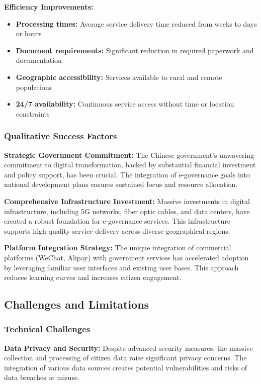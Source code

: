 \documentclass[12pt,a4paper]{article}
\begin{document}
\textbf{Efficiency Improvements:}
\begin{itemize}
    \item \textbf{Processing times:} Average service delivery time reduced from weeks to days or hours
    \item \textbf{Document requirements:} Significant reduction in required paperwork and documentation
    \item \textbf{Geographic accessibility:} Services available to rural and remote populations
    \item \textbf{24/7 availability:} Continuous service access without time or location constraints
\end{itemize}

\subsubsection{Qualitative Success Factors}

\textbf{Strategic Government Commitment:}
The Chinese government's unwavering commitment to digital transformation, backed by substantial financial investment and policy support, has been crucial. The integration of e-governance goals into national development plans ensures sustained focus and resource allocation.

\textbf{Comprehensive Infrastructure Investment:}
Massive investments in digital infrastructure, including 5G networks, fiber optic cables, and data centers, have created a robust foundation for e-governance services. This infrastructure supports high-quality service delivery across diverse geographical regions.

\textbf{Platform Integration Strategy:}
The unique integration of commercial platforms (WeChat, Alipay) with government services has accelerated adoption by leveraging familiar user interfaces and existing user bases. This approach reduces learning curves and increases citizen engagement.

\subsection{Challenges and Limitations}

\subsubsection{Technical Challenges}

\textbf{Data Privacy and Security:}
Despite advanced security measures, the massive collection and processing of citizen data raise significant privacy concerns. The integration of various data sources creates potential vulnerabilities and risks of data breaches or misuse.
\end{document}
